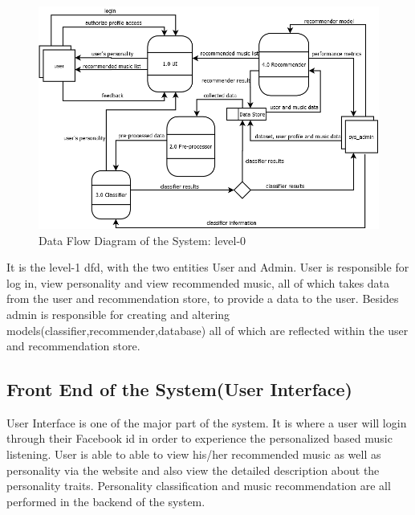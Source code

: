 \begin{figure}[!ht]
\centering
\includegraphics[width = 16 cm]{fig/new/dfd.png}
\caption{Data Flow Diagram of the System: level-0}
\label{fig:dfd}
\end{figure}

It is the level-1 dfd, with the two entities User and Admin. User is responsible for log in, view personality and view recommended music, all of which takes data from the user and recommendation store, to provide a data to the user. Besides admin is responsible for creating and altering models(classifier,recommender,database) all of which are reflected within the user and recommendation store.

\subsection{Front End of the System(User Interface)}
User Interface is one of the major part of the system. It is where a user will login through their Facebook id in order to experience the personalized based music listening. User is able to able to view his/her recommended music as well as personality via the website and also view the detailed description about the personality traits. Personality classification and music recommendation are all performed in the backend of the system.


